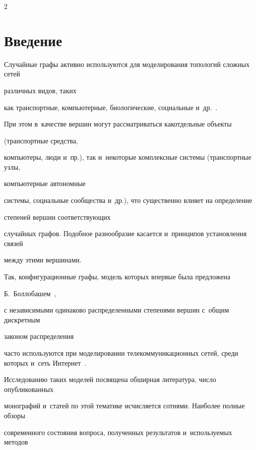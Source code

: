 \begin{multicols}{2}





\label{st\stat}








\section{Введение}





Случайные графы активно используются для моделирования топологий сложных сетей 


различных видов, таких


как транспортные, компьютерные, биологические, социальные и~др.~\cite{Dur,Hof1,Hof2,Fa}.


При этом в~качестве вершин могут рассматриваться как\linebreak отдельные объекты 


(транспортные средства,


компьютеры, люди и~пр.), так и~некоторые комплекс\-ные сис\-те\-мы (транспортные узлы, 


компьютерные автономные


сис\-те\-мы, социальные сообщества и~др.), что существенно влияет на определение 


степеней вершин соответствующих


случайных графов. Подобное разнообразие касается и~принципов установления связей 


между этими вершинами.


Так, конфигурационные графы, модель которых впервые была предложена 


Б.~Боллобашем~\cite{Bol},


с независимыми одинаково распределенными степенями вершин с~общим дискретным 


законом распределения


часто используются при моделировании телекоммуникационных сетей, среди которых и~сеть Интернет~\cite{Fa,RN}.


Исследованию таких моделей посвящена обширная литература, число опуб\-ли\-ко\-ван\-ных 


монографий и~статей по этой тематике исчисляется сотнями. Наиболее полные обзоры 


современного со\-сто\-яния вопроса, полученных результатов и~ис\-поль\-зу\-емых методов 



\end{multicols}
